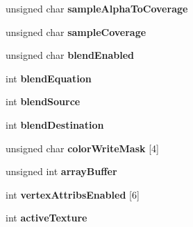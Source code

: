 \begin{DoxyCompactItemize}
\item 
\hypertarget{struct_render_states_af734fdc472ec1288de5ff72b3639f457}{unsigned char {\bfseries sample\-Alpha\-To\-Coverage}}\label{struct_render_states_af734fdc472ec1288de5ff72b3639f457}

\item 
\hypertarget{struct_render_states_ab85a1a6f42f9b856f136bdf456e8d08c}{unsigned char {\bfseries sample\-Coverage}}\label{struct_render_states_ab85a1a6f42f9b856f136bdf456e8d08c}

\item 
\hypertarget{struct_render_states_a85a29b560f1a5e5be5012e8bbac9b729}{unsigned char {\bfseries blend\-Enabled}}\label{struct_render_states_a85a29b560f1a5e5be5012e8bbac9b729}

\item 
\hypertarget{struct_render_states_adbee0d395b078911dd49d5d7fd6c744f}{int {\bfseries blend\-Equation}}\label{struct_render_states_adbee0d395b078911dd49d5d7fd6c744f}

\item 
\hypertarget{struct_render_states_ac0cae6096b5454e685815edf1c41f188}{int {\bfseries blend\-Source}}\label{struct_render_states_ac0cae6096b5454e685815edf1c41f188}

\item 
\hypertarget{struct_render_states_abb72577e5e83fc705103a4192ecb3da1}{int {\bfseries blend\-Destination}}\label{struct_render_states_abb72577e5e83fc705103a4192ecb3da1}

\item 
\hypertarget{struct_render_states_ae9465ac804ffa406565da01b3b189ada}{unsigned char {\bfseries color\-Write\-Mask} \mbox{[}4\mbox{]}}\label{struct_render_states_ae9465ac804ffa406565da01b3b189ada}

\item 
\hypertarget{struct_render_states_a0ce45ab772961df0a1bf382017a7c198}{unsigned int {\bfseries array\-Buffer}}\label{struct_render_states_a0ce45ab772961df0a1bf382017a7c198}

\item 
\hypertarget{struct_render_states_ae0c2efdc0ff5c46bbffda94452682b82}{int {\bfseries vertex\-Attribs\-Enabled} \mbox{[}6\mbox{]}}\label{struct_render_states_ae0c2efdc0ff5c46bbffda94452682b82}

\item 
\hypertarget{struct_render_states_a36935647896a1f931c94c7c50df9bb49}{int {\bfseries active\-Texture}}\label{struct_render_states_a36935647896a1f931c94c7c50df9bb49}


\end{DoxyCompactItemize}

